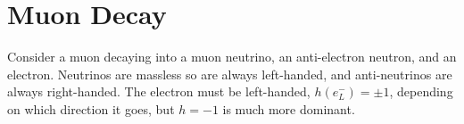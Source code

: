 \documentclass[a4paper, 11pt, normalem]{report}
\begin{document}
\section{Muon Decay}
Consider a muon decaying into a muon neutrino, an anti-electron neutron, and an electron. 
Neutrinos are massless so are always left-handed, and anti-neutrinos are always right-handed. 
The electron must be left-handed, $h(e_L^-) = \pm1$, depending on which direction it goes, but $h=-1$ is much more dominant.
\end{document}
